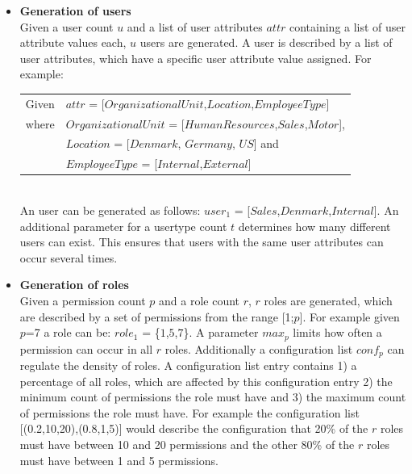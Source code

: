 \begin{itemize}
	\item \textbf{Generation of users}\\
	Given a user count $u$ and a list of user attributes $attr$ containing a list of user attribute values each, $u$ users are generated. A user is described by a list of user attributes, which have a specific user attribute value assigned. For example:\\
	\begin{listliketab}
		\begin{tabular}{ll}
			Given   &  $attr$ = [$OrganizationalUnit$,$Location$,$EmployeeType$]\\
			where   &  $OrganizationalUnit$ = [$HumanResources$,$Sales$,$Motor$],\\
			&  $Location$ = [$Denmark$, $Germany$, $US$] and\\
			&  $EmployeeType$ = [$Internal$,$External$]\\
		\end{tabular}
	\end{listliketab}\\
	An user can be generated as follows: $user_1$ = [$Sales$,$Denmark$,$Internal$]. An additional parameter for a usertype count $t$ determines how many different users can exist. This ensures that users with the same user attributes can occur several times.
	
	\item \textbf{Generation of roles}\\
	Given a permission count $p$ and a role count $r$, $r$ roles are generated, which are described by a set of permissions from the range [1;$p$]. For example given $p$=7 a role can be: $role_1$ = \{$1$,$5$,$7$\}. A parameter $max_p$ limits how often a permission can occur in all $r$ roles. Additionally a configuration list $conf_p$ can regulate the density of roles. A configuration list entry contains 1) a percentage of all roles, which are affected by this configuration entry 2) the minimum count of permissions the role must have and 3) the maximum count of permissions the role must have. For example the configuration list [(0.2,10,20),(0.8,1,5)] would describe the configuration that 20\% of the $r$ roles must have between 10 and 20 permissions and the other 80\% of the $r$ roles must have between 1 and 5 permissions.
	

\end{itemize}
